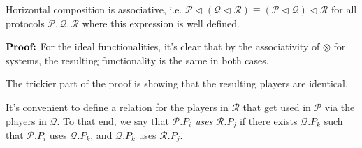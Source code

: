 \begin{lemma}
Horizontal composition is associative, i.e.
${\mathscr{P} \lhd (\mathscr{Q} \lhd \mathscr{R}) \equiv (\mathscr{P} \lhd \mathscr{Q}) \lhd \mathscr{R}}$
for all protocols $\mathscr{P}, \mathscr{Q}, \mathscr{R}$ where this expression is well defined.

$\textbf{Proof:}$
For the ideal functionalities, it's clear that by the associativity
of $\otimes$ for systems, the resulting functionality is the same
in both cases.

The trickier part of the proof is showing that the resulting players
are identical.

It's convenient to define a relation for the players in $\mathscr{R}$
that get used in $\mathscr{P}$ via the players in $\mathscr{Q}$.
To that end, we say that $\mathscr{P}.P_i$ \emph{uses} $\mathscr{R}.P_j$
if there exists $\mathscr{Q}.P_k$ such that $\mathscr{P}.P_i$ uses
$\mathscr{Q}.P_k$, and $\mathscr{Q}.P_k$ uses $\mathscr{R}.P_j$.


\end{lemma}
